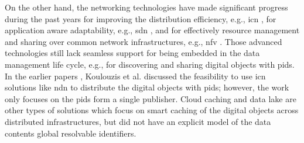 \documentclass[conference]{IEEEtran}
\begin{document}


On the other hand, the networking technologies have made significant progress during the past years for improving the distribution efficiency, e.g., \gls{icn} \cite{zhang2014named}, for application aware adaptability, e.g., \gls{sdn} \cite{kreutz2014software}, and for effectively resource management and sharing over common network infrastructures, e.g., \gls{nfv} \cite{han2015network}. Those advanced technologies still lack seamless support for being embedded in the data management life cycle, e.g., for discovering and sharing digital objects with \glspl{pid}. In the earlier papers \cite{koulouzis2018information}, Koulouzis et al. discussed the feasibility to use \gls{icn} solutions like \gls{ndn} to distribute the digital objects with \glspl{pid}; however, the work only focuses on the \glspl{pid} form a single publisher. Cloud caching \cite{} and data lake \cite{} are other types of solutions which focus on smart caching of the digital objects across distributed infrastructures, but did not have an explicit model of the data contents global resolvable identifiers.
\end{document}
